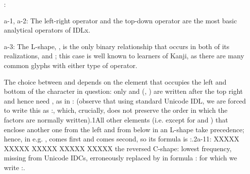 \vspace{\myLineheight}\begin{multicols}{2}:

{\mktsStyleBold{}a-1}, {\mktsStyleBold{}a-2}: The left-right operator \cjkgGlue{} and the top-down operator \cjkgGlue{}
are the most basic analytical operators of IDLx.

{\mktsStyleBold{}a-3}: The L-shape, \cjkgGlue{}, is the only binary relationship that occurs in both of
its realizations, \cjkgGlue{} and \cjkgGlue{}; this case is well known to learners of Kanji, as
there are many common glyphs with either type of operator.

The choice between \cjkgGlue{} and \cjkgGlue{} depends on the element that occupies the left and bottom of the character in
question: only \cjkgGlue{} and \cjkgGlue{} (\cjkgGlue{}, \cjkgGlue{}) are written {\mktsStyleItalic{}after\/} the top right and hence
need \cjkgGlue{}, as in \cjkgGlue{}:\cjkgGlue{} (observe that using standard Unicode IDL, we are forced to write
this as
\cjkgGlue{}:\cjkgGlue{}\cjkgGlue{}, which,
crucially, does not preserve the order in which the factors are normally written).{\mktsEnStyleMarkMain{}1}All other elements (i.e. except for \cjkgGlue{} and \cjkgGlue{}) that enclose another one from the left and
from below in an L-shape take precedence; hence, in e.g. \cjkgGlue{}, \cjkgGlue{} comes first and \cjkgGlue{}
comes second, so its formula is \cjkgGlue{}:\cjkgGlue{}\cjkgGlue{}.{\mktsEnStyleMarkMain{}2}{\mktsStyleBold{}a-11}: XXXXX XXXXX XXXXX XXXXX XXXXX the reversed C-shape: lowest frequency, missing from Unicode IDCs,
erroneously replaced by \cjkgGlue{} in formula
\cjkgGlue{}:\cjkgGlue{}\cjkgGlue{} for which we write \cjkgGlue{}:\cjkgGlue{}\cjkgGlue{}.


\end{multicols}
